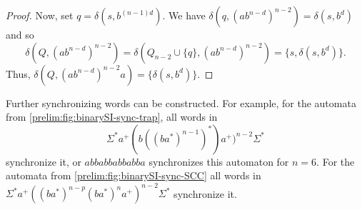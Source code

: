 \begin{proof}
Now, set $q = \delta(s, b^{(n-1)d})$. We have $\delta(q, (ab^{n-d})^{n-2}) = \delta(s, b^d)$
and so
\[
\delta(Q, (ab^{n-d})^{n-2}) = \delta(Q_{n-2} \cup \{q\}, (ab^{n-d})^{n-2})
= \{s, \delta(s, b^d) \}.
\]
Thus, $\delta(Q, (ab^{n-d})^{n-2}a) = \{ \delta(s, b^d)\}$.
%
%
%
%
%
\end{proof}

Further synchronizing words can be constructed. For example,
for the automata from \cref{prelim:fig:binarySI-sync-trap},
all words in
	\[
\Sigma^*a^+(b((ba^*)^{n-1})^*)a^+)^{n-2}\Sigma^*
\]
synchronize it, or $abbabbabbabba$ synchronizes this automaton for $n = 6$.
For the automata from \cref{prelim:fig:binarySI-sync-SCC} 
all words in 
$
\Sigma^*a^+((ba^*)^{n-p}(ba^*)^n a^+)^{n-2}\Sigma^*
$
synchronize it.

